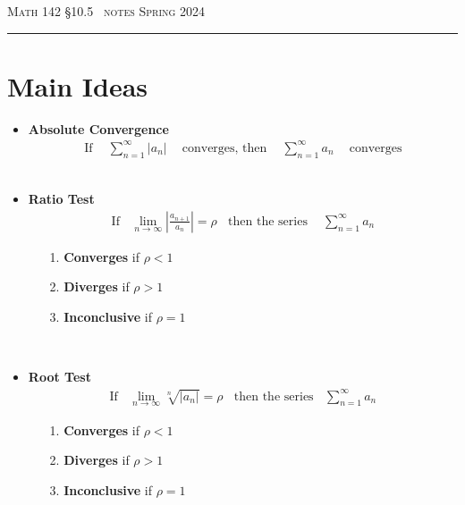 \documentclass{article}
\def\chapt{10.5}
\begin{document}
\noindent
{\scshape Math 142} \hfill {\scshape \S\chapt~ notes} \hfill {\scshape Spring 2024}

\smallskip

\hrule

\bigskip

\section*{Main Ideas}

\begin{itemize}
\item
\textbf{Absolute Convergence}
\begin{gather*}
\text{If }
~~~~\sum_{n=1}^{\infty~} |a_n|
~~~~\text{ converges, then }~~~~
\sum_{n=1}^{\infty} a_n
~~~~\text{ converges}
\end{gather*}
\\

\item
\textbf{Ratio Test}
\begin{gather*}
\text{If}~~~~
\lim_{n \to \infty} \left| \frac{a_{n+1}}{a_n} \right| = \rho
~~~~\text{then the series }~~~~
\sum_{n=1}^{\infty} a_n
\end{gather*}
\begin{enumerate}
\item[1.]
\textbf{Converges} if $\rho<1$
\item[2.]
\textbf{Diverges} if $\rho>1$
\item[3.]
\textbf{Inconclusive} if $\rho=1$
\end{enumerate}
\hfill
\\

\item
\textbf{Root Test}
\begin{gather*}
\text{If}~~~~
\lim_{n\to \infty} \sqrt[n]{|a_n|} = \rho
~~~~\text{then the series}~~~~
\sum_{n=1}^{\infty} a_n
\end{gather*}
\begin{enumerate}
\item[1.]
\textbf{Converges} if $\rho<1$
\item[2.]
\textbf{Diverges} if $\rho>1$
\item[3.]
\textbf{Inconclusive} if $\rho=1$
\end{enumerate}
\hfill
\\

\end{itemize}
\end{document}

